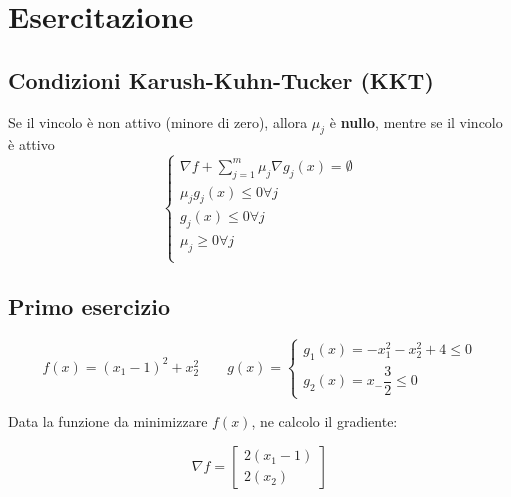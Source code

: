 \documentclass[\main/main.tex]{subfiles}
\begin{document}
\section{Esercitazione}

\subsection{Condizioni Karush-Kuhn-Tucker (KKT)}
Se il vincolo è non attivo (minore di zero), allora $\mu_j$ è \textbf{nullo}, mentre se il vincolo è attivo
\[
	\begin{cases}
		\nabla f + \sum_{j=1}^m \mu_j \nabla g_j (x) = \emptyset \\
		\mu_j g_j(x) \leq 0 \forall j                            \\
		g_j(x) \leq 0 \forall j                                  \\
		\mu_j \geq 0 \forall j                                   \\
	\end{cases}
\]

\subsection{Primo esercizio}

\begin{center}
\end{center}


\[
	f(x) = (x_1 - 1)^2 + x_2^2
	\qquad
	g(x) = \begin{cases}
		g_1(x) = -x_1 ^2 - x_2^2 + 4 \leq 0 \\
		g_2(x) = x_ - \dfrac{3}{2} \leq 0
	\end{cases}
\]

Data la funzione da minimizzare $f(x)$, ne calcolo il gradiente:

\[
	\nabla f = \begin{bmatrix}
		2(x_1-1) \\
		2(x_2)
	\end{bmatrix}
\]
\end{document}
